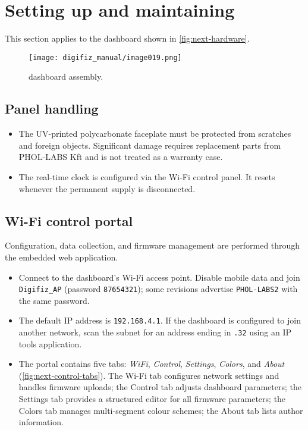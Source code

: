 \chapter{Setting up and maintaining \ReplicaNextLong{}}\label{ch:replica-next-setup}

This section applies to the \ReplicaNextLong{} dashboard shown in \autoref{fig:next-hardware}.

\begin{figure}[htbp]
    \centering
    \texttt{[image: digifiz\_manual/image019.png]}
    \caption{\ReplicaNextLong{} dashboard assembly.}
    \label{fig:next-hardware}
\end{figure}

\section{Panel handling}
\begin{itemize}
    \item The UV-printed polycarbonate faceplate must be protected from scratches and foreign objects. Significant damage requires replacement parts from PHOL-LABS Kft and is not treated as a warranty case.
    \item The real-time clock is configured via the Wi-Fi control panel. It resets whenever the permanent supply is disconnected.
\end{itemize}

\section{Wi-Fi control portal}
Configuration, data collection, and firmware management are performed through the embedded web application.
\begin{itemize}
    \item Connect to the dashboard's Wi-Fi access point. Disable mobile data and join \texttt{Digifiz\_AP} (password \texttt{87654321}); some revisions advertise \texttt{PHOL-LABS2} with the same password.
    \item The default IP address is \texttt{192.168.4.1}. If the dashboard is configured to join another network, scan the subnet for an address ending in \texttt{.32} using an IP tools application.
    \item The portal contains five tabs: \emph{WiFi}, \emph{Control}, \emph{Settings}, \emph{Colors}, and \emph{About} (\autoref{fig:next-control-tabs}). The Wi-Fi tab configures network settings and handles firmware uploads; the Control tab adjusts dashboard parameters; the Settings tab provides a structured editor for all firmware parameters; the Colors tab manages multi-segment colour schemes; the About tab lists author information.
\end{itemize}

